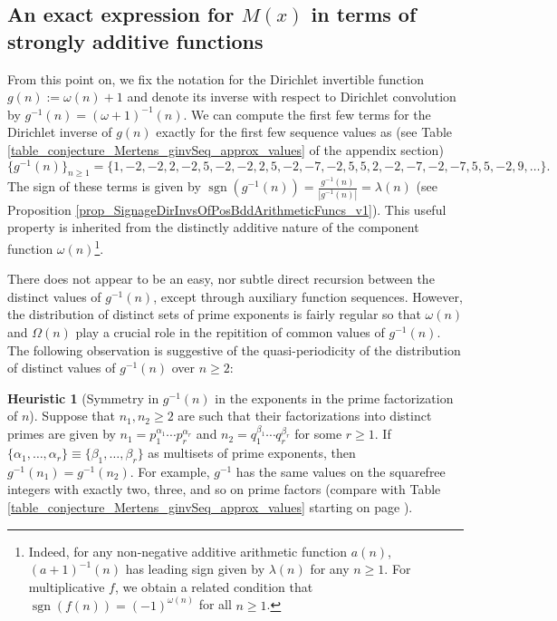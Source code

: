 \documentclass[11pt,reqno,a4letter]{article}
\numberwithin{figure}{section}
\numberwithin{table}{section}
\theoremstyle{plain}
\numberwithin{theorem}{section}
\theoremstyle{definition}
\newtheorem{heuristic}[theorem]{Heuristic}
\begin{document}
\subsection{An exact expression for $M(x)$ in terms of strongly additive functions} 
\label{example_InvertingARecRelForMx_Intro}

From this point on, we fix the notation for the Dirichlet invertible function $g(n) := \omega(n) + 1$ and denote its 
inverse with respect to Dirichlet convolution by $g^{-1}(n) = (\omega+1)^{-1}(n)$. 
We can compute the first few terms for the
Dirichlet inverse of $g(n)$ exactly for the first few sequence values as 
(see Table \ref{table_conjecture_Mertens_ginvSeq_approx_values} of the appendix section) 
\[
\{g^{-1}(n)\}_{n \geq 1} = \{1, -2, -2, 2, -2, 5, -2, -2, 2, 5, -2, -7, -2, 5, 5, 2, -2, -7, -2, 
     -7, 5, 5, -2, 9, \ldots \}. 
\] 
The sign of these terms is given by $\operatorname{sgn}(g^{-1}(n)) = \frac{g^{-1}(n)}{|g^{-1}(n)|} = \lambda(n)$ 
(see Proposition \ref{prop_SignageDirInvsOfPosBddArithmeticFuncs_v1}). 
This useful property is inherited from the distinctly 
additive nature of the component function $\omega(n)$\footnote{ 
     Indeed, for any non-negative additive arithmetic function $a(n)$, 
     $(a+1)^{-1}(n)$ has leading sign given by $\lambda(n)$ for any $n \geq 1$. 
     For multiplicative $f$, we obtain a related condition that 
     $\operatorname{sgn}(f(n)) = (-1)^{\omega(n)}$ for all $n \geq 1$. 
}. 

There does not appear to be an easy, nor subtle 
direct recursion between the distinct values of $g^{-1}(n)$, except through auxiliary function sequences. 
However, the distribution of distinct sets of prime exponents is fairly regular so that 
$\omega(n)$ and $\Omega(n)$ play a crucial role in the repitition of common values of 
$g^{-1}(n)$. 
The following observation is suggestive of the quasi-periodicity of the distribution of 
distinct values of $g^{-1}(n)$ over $n \geq 2$: 

\begin{heuristic}[Symmetry in $g^{-1}(n)$ in the exponents in the prime factorization of $n$] 
Suppose that $n_1, n_2 \geq 2$ are such that their factorizations into distinct primes are 
given by $n_1 = p_1^{\alpha_1} \cdots p_r^{\alpha_r}$ and $n_2 = q_1^{\beta_1} \cdots q_r^{\beta_r}$ 
for some $r \geq 1$. 
If $\{\alpha_1, \ldots, \alpha_r\} \equiv \{\beta_1, \ldots, \beta_r\}$ as multisets of prime exponents, 
then $g^{-1}(n_1) = g^{-1}(n_2)$. For example, $g^{-1}$ has the same values on the squarefree integers 
with exactly two, three, and so on prime factors 
(compare with Table \ref{table_conjecture_Mertens_ginvSeq_approx_values} starting on page 
\pageref{table_conjecture_Mertens_ginvSeq_approx_values}). 
\end{heuristic} 
\end{document}
